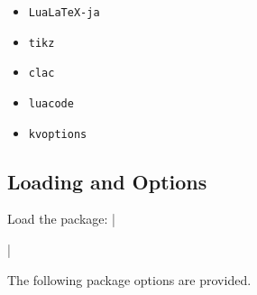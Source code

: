 \documentclass[luatex,fontsize=8pt,paper=b5,twoside]{jlreq}%
\begin{document}
\begin{itemize}
    \item \texttt{LuaLaTeX-ja}
    \item \texttt{tikz}
    \item \texttt{clac}
    \item \texttt{luacode}
    \item \texttt{kvoptions}
\end{itemize}

\subsection{Loading and Options}
Load the package: \KKverb|\usepackage[<options>]{KKsymbols}|

The following package options are provided.
\end{document}
